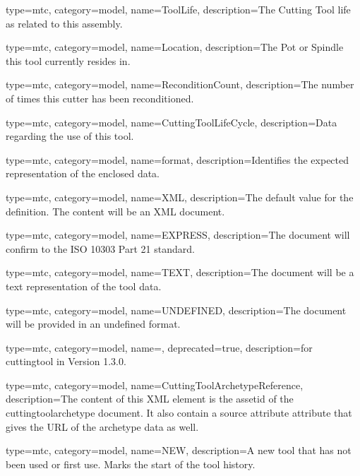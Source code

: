 {
  type=mtc,
  category=model,
  name={ToolLife},
  description={The Cutting Tool life as related to this assembly.}
}


{
  type=mtc,
  category=model,
  name={Location},
  description={The Pot or Spindle this tool currently resides in.}
}


{
  type=mtc,
  category=model,
  name={ReconditionCount},
  description={The number of times this cutter has been reconditioned.}
}


{
  type=mtc,
  category=model,
  name={CuttingToolLifeCycle},
  description={Data regarding the use of this tool.}
}


{
  type=mtc,
  category=model,
  name={format},
  description={Identifies the expected representation of the enclosed data.}
}


{
  type=mtc,
  category=model,
  name={XML},
  description={The default value for the definition. The content will be an XML document.}
}


{
  type=mtc,
  category=model,
  name={EXPRESS},
  description={The document will confirm to the ISO 10303 Part 21 standard.}
}


{
  type=mtc,
  category=model,
  name={TEXT},
  description={The document will be a text representation of the tool data.}
}


{
  type=mtc,
  category=model,
  name={UNDEFINED},
  description={The document will be provided in an undefined format.}
}


{
  type=mtc,
  category=model,
  name=,
  deprecated={true},
  description={\DEPRECATED for \gls{cuttingtool} in Version 1.3.0.   \newline {}}
}


{
  type=mtc,
  category=model,
  name={CuttingToolArchetypeReference},
  description={The content of this XML element is the \gls{assetid} of the \gls{cuttingtoolarchetype} document. It \MAY also contain a \gls{source attribute} attribute that gives the URL of the archetype data as well.}
}


{
  type=mtc,
  category=model,
  name={NEW},
  description={A new tool that has not been used or first use. Marks the start of the tool history.}
}



